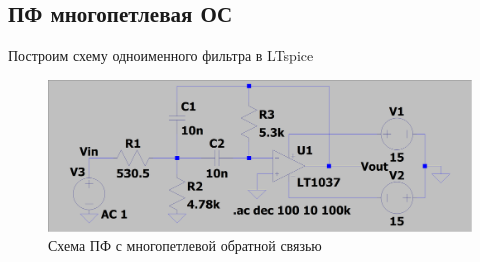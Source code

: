 \documentclass[a4paper, 12pt]{article}
\begin{document}
    \subsection{ПФ многопетлевая ОС}
    Построим схему одноименного фильтра в LTspice
    \begin{figure}[H]
        \centering
        \includegraphics[scale=0.22]{scheme4.png}
        \captionsetup{skip=0pt}
        \caption{Схема ПФ с многопетлевой обратной связью}
        \label{fig:scheme4}
    \end{figure}
\end{document}

